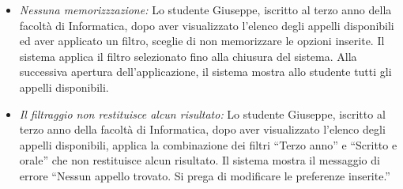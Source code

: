 \begin{itemize}
	\item \textit{Nessuna memorizzzazione:}
	Lo studente Giuseppe, iscritto al terzo anno della facoltà di Informatica, dopo aver visualizzato l’elenco degli appelli disponibili ed aver applicato un filtro, sceglie di non memorizzare le opzioni inserite. Il sistema applica il filtro selezionato fino alla chiusura del sistema. Alla successiva apertura dell'applicazione, il sistema mostra allo studente tutti gli appelli disponibili.
	
	\item \textit{Il filtraggio non restituisce alcun risultato:}
	Lo studente Giuseppe, iscritto al terzo anno della facoltà di Informatica, dopo aver visualizzato l’elenco degli appelli disponibili, applica la combinazione dei filtri “Terzo anno” e “Scritto e orale” che non restituisce alcun risultato. Il sistema mostra il messaggio di errore “Nessun appello trovato. Si prega di modificare le preferenze inserite.”
\end{itemize}

